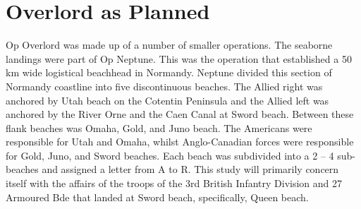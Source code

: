 \documentclass[noraggedright]{turabian-researchpaper}
\begin{document}

\section{Overlord as Planned} %






Op Overlord was made up of a number of smaller operations.  The seaborne
landings were part of Op Neptune.  This was the operation that established a
50 km wide logistical beachhead in Normandy.  Neptune divided this section of
Normandy coastline into five discontinuous beaches.  The Allied right was 
anchored by Utah beach on the Cotentin Peninsula and the Allied left was 
anchored by the River Orne and the Caen Canal at Sword beach.  Between
these flank beaches was Omaha, Gold, and Juno beach.  The Americans were 
responsible for Utah and Omaha, whilst Anglo-Canadian forces were responsible
for Gold, Juno, and Sword beaches.  Each beach was subdivided into a 2 -- 4
sub-beaches and assigned a letter from A to R.  This study will primarily 
concern itself with the affairs of the troops of the 3rd British Infantry 
Division and 27 Armoured Bde that landed at Sword beach, specifically, Queen 
beach.  
\end{document}
